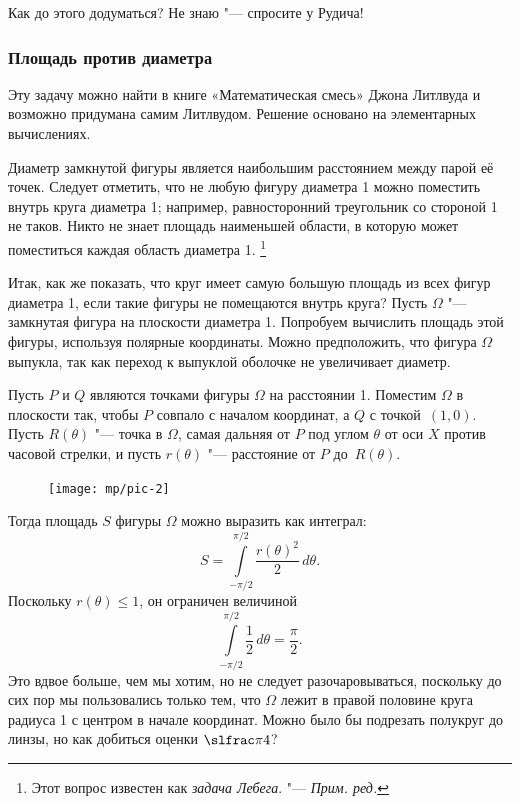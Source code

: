 \documentclass[twoside]{book}
\begin{document}
Как до этого додуматься?
Не  знаю "--- спросите у Рудича!

\subsubsection*{Площадь против диаметра}

Эту задачу можно найти в книге «Математическая смесь» Джона Литлвуда и возможно придумана самим Литлвудом.
Решение основано на элементарных вычислениях.

\medskip

Диаметр замкнутой фигуры является наибольшим расстоянием между парой её точек.
Следует отметить, что не любую фигуру диаметра 1 можно поместить внутрь круга диаметра 1;
например, равносторонний треугольник со стороной 1 не таков.
Никто не знает площадь наименьшей области, в которую может поместиться каждая область диаметра 1.%
\footnote{Этот вопрос известен как \emph{задача Лебега}. "--- \emph{Прим. ред.}}

Итак, как же показать, что круг имеет самую большую площадь из всех фигур диаметра 1, если такие фигуры не помещаются внутрь круга?
Пусть $\Omega$ "--- замкнутая фигура на плоскости диаметра 1.
Попробуем вычислить площадь этой фигуры, используя полярные координаты.
Можно предположить, что фигура $\Omega$ выпукла, так как переход к выпуклой оболочке не увеличивает диаметр.

Пусть $P$ и $Q$ являются точками фигуры $\Omega$ на расстоянии 1.
Поместим $\Omega$ в плоскости так, чтобы $P$ совпало с началом координат, а $Q$ с точкой~$(1,0)$.
Пусть $R(\theta)$ "--- точка в $\Omega$, самая дальняя от $P$ под углом $\theta$ от оси $X$ против часовой стрелки, и пусть $r(\theta)$ "--- расстояние от $P$ до~$R(\theta)$.


\begin{figure}
\vskip4mm
\centering
\texttt{[image: mp/pic-2]}
\end{figure}

Тогда площадь $S$ фигуры $\Omega$ можно выразить как интеграл:
\[S=\int\limits_{-\pi/2}^{\pi/2}\frac{r(\theta)^2}{2}\,d\theta.\]
Поскольку $r(\theta) \le 1$, он ограничен величиной
\[\int\limits_{-\pi/2}^{\pi/2}\frac{1}{2}\,d\theta=\frac\pi2.\]
Это вдвое больше, чем мы хотим, но не следует разочаровываться, поскольку до сих пор мы пользовались только тем, что $\Omega$ лежит в правой половине круга радиуса 1 с центром в начале координат.
Можно было бы подрезать полукруг до линзы, но как добиться оценки $\slfrac\pi4$?
\end{document}
